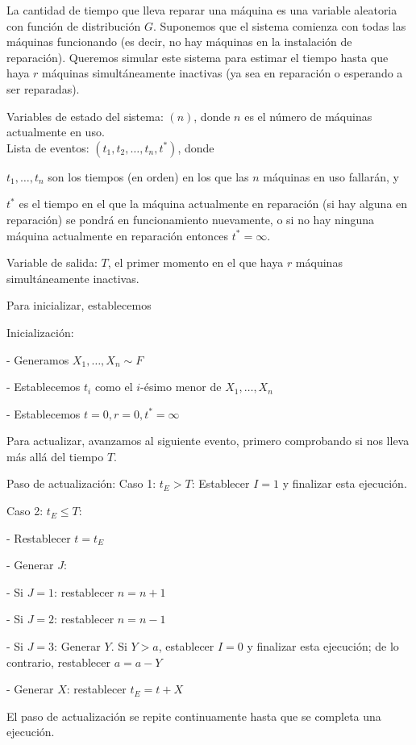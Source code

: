 \documentclass[a4paper, 12pt]{article}
\begin{document}
La cantidad de tiempo que lleva reparar una máquina es una variable aleatoria con función de distribución $G$. Suponemos que el sistema comienza con todas las máquinas funcionando (es decir, no hay máquinas en la instalación de reparación). Queremos simular este sistema para estimar el tiempo hasta que haya $r$ máquinas simultáneamente inactivas (ya sea en reparación o esperando a ser reparadas).

Variables de estado del sistema: $(n)$, donde $n$ es el número de máquinas actualmente en uso. \\

Lista de eventos: $(t_1, t_2, \dots, t_n, t^*)$, donde 

$t_1, \dots, t_n$ son los tiempos (en orden) en los que las $n$ máquinas en uso fallarán, y 

$t^*$ es el tiempo en el que la máquina actualmente en reparación (si hay alguna en reparación) se pondrá en funcionamiento nuevamente, o si no hay ninguna máquina actualmente en reparación entonces $t^* = \infty$.

Variable de salida: $T$, el primer momento en el que haya $r$ máquinas simultáneamente inactivas.

Para inicializar, establecemos

Inicialización:


- Generamos $X_1, \dots, X_n \sim F$

- Establecemos $t_i$ como el $i$-ésimo menor de $X_1, \dots, X_n$

- Establecemos $t = 0, r = 0, t^* = \infty$


Para actualizar, avanzamos al siguiente evento, primero comprobando si nos lleva más allá del tiempo $T$.

Paso de actualización:
Caso 1: $t_E > T$: 
Establecer $I = 1$ y finalizar esta ejecución.

Caso 2: $t_E \leq T$:


- Restablecer $t = t_E$

- Generar $J$:


- Si $J = 1$: restablecer $n = n + 1$

- Si $J = 2$: restablecer $n = n - 1$

- Si $J = 3$: Generar $Y$. Si $Y > a$, establecer $I = 0$ y finalizar esta ejecución; de lo contrario, restablecer $a = a - Y$


- Generar $X$: restablecer $t_E = t + X$


El paso de actualización se repite continuamente hasta que se completa una ejecución.
\end{document}
